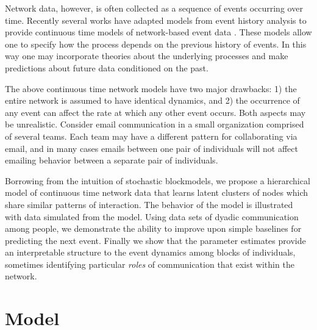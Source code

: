 \documentclass[11pt]{article}
\begin{document}
Network data, however, is often collected as a sequence of events occurring over time.   Recently several works have adapted models from event history analysis \cite{} to provide continuous time models of network-based event data \cite{Butts2008,Brandes2009,Perry2011,Stadtfeld2010,Stadtfeld2011,Opsahl2011,Vu2011,Vu2011a}.  These models allow one to specify how the process depends on the previous history of events.  In this way one may incorporate theories about the underlying processes and make predictions about future data conditioned on the past.

The above continuous time network models have two major drawbacks: 1) the entire network is assumed to have identical dynamics, and 2) the occurrence of any event can affect the rate at which any other event occurs.  Both aspects may be unrealistic.  Consider email communication in a small organization comprised of several teams.  Each team may have a different pattern for collaborating via email, and in many cases emails between one pair of individuals will not affect emailing behavior between a separate pair of individuals.

Borrowing from the intuition of stochastic blockmodels, we propose a hierarchical model of continuous time network data that learns latent clusters of nodes which share similar patterns of interaction.  The behavior of the model is illustrated with data simulated from the model.  Using  data sets of dyadic communication among people, we demonstrate the ability to improve upon simple baselines for predicting the next event.  Finally we show that the parameter estimates provide an interpretable structure to the event dynamics among blocks of individuals, sometimes identifying particular \emph{roles} of communication that exist within the network.
  
\section{Model}
\end{document}

